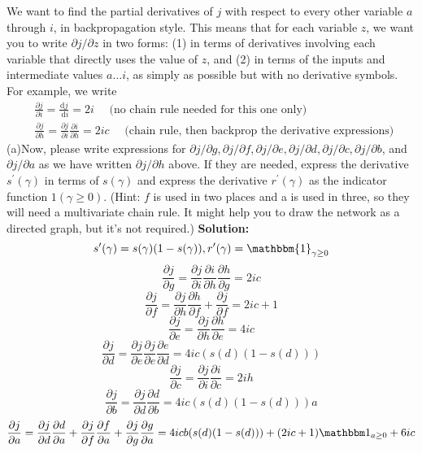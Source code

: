 \documentclass[10pt]{article}
\begin{document}
\begin{enumerate}[1.]
We want to find the partial derivatives of $j$ with respect to every other variable $a$ through $i$, in backpropagation style. This means that for each variable $z$, we want you to write $\partial j / \partial z$ in two forms: (1) in terms of derivatives involving each variable that directly uses the value of $z$, and (2) in terms of the inputs and intermediate values $a \ldots i$, as simply as possible but with no derivative symbols. For example, we write
$$
\begin{aligned}
& \frac{\partial j}{\partial i}=\frac{\mathrm{d} j}{\mathrm{~d} i}=2 i \quad \text { (no chain rule needed for this one only) } \\
& \frac{\partial j}{\partial h}=\frac{\partial j}{\partial i} \frac{\partial i}{\partial h}=2 i c \quad \text { (chain rule, then backprop the derivative expressions) }
\end{aligned}
$$
(a)Now, please write expressions for $\partial j / \partial g, \partial j / \partial f, \partial j / \partial e, \partial j / \partial d, \partial j / \partial c, \partial j / \partial b$, and $\partial j / \partial a$ as we have written $\partial j / \partial h$ above. If they are needed, express the derivative $s^{\prime}(\gamma)$ in terms of $s(\gamma)$ and express the derivative $r^{\prime}(\gamma)$ as the indicator function $1(\gamma \geq 0)$. (Hint: $f$ is used in two places and a is used in three, so they will need a multivariate chain rule. It might help you to draw the network as a directed graph, but it's not required.)
\textbf{Solution:}
$$s'(\gamma)=s(\gamma)(1-s(\gamma)),r'(\gamma)=\mathbbm{1}_{\gamma\geq0}$$
$$\frac{\partial j}{\partial g}=\frac{\partial j}{\partial i}\frac{\partial i}{\partial h}\frac{\partial h}{\partial g}=2ic$$
$$\frac{\partial j}{\partial f}=\frac{\partial j}{\partial h}\frac{\partial h}{\partial f}+\frac{\partial j}{\partial f}=2ic+1$$
\[\frac{\partial j}{\partial e}=\frac{\partial j}{\partial h}\frac{\partial h}{\partial e}=4ic\]
$$\frac{\partial j}{\partial d}=\frac{\partial j}{\partial e}\frac{\partial j}{\partial e}\frac{\partial e}{\partial d}=4ic(s(d)(1-s(d)))$$
$$\frac{\partial j}{\partial c}=\frac{\partial j}{\partial i}\frac{\partial i}{\partial c}=2ih $$
$$\frac{\partial j}{\partial b}=\frac{\partial j}{\partial d}\frac{\partial d}{\partial b}=4ic(s(d)(1-s(d)))a$$
$$\frac{\partial j}{\partial a}=\frac{\partial j}{\partial d}\frac{\partial d}{\partial a}+\frac{\partial j}{\partial f}\frac{\partial f}{\partial a}+\frac{\partial j}{\partial g}\frac{\partial g}{\partial a}=4icb(s(d)(1-s(d)))+(2ic+1)\mathbbm1_{a\geq0}+6ic$$
\end{enumerate}
\end{document}
